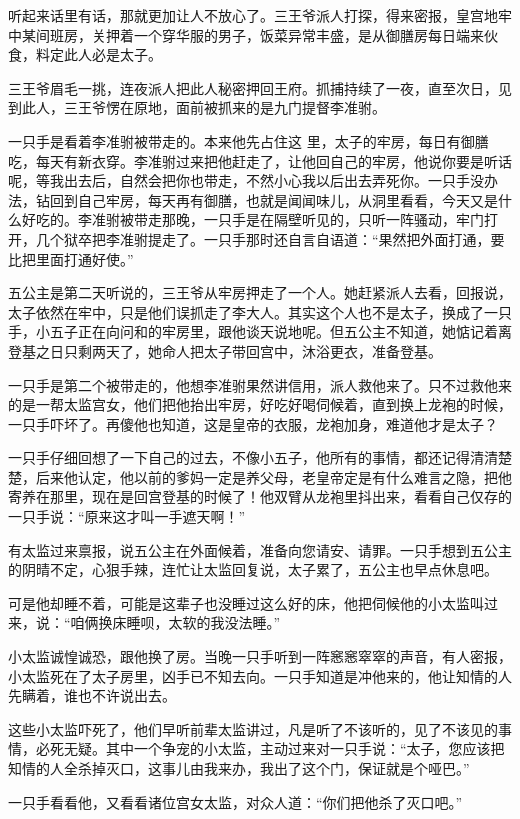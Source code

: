 听起来话里有话，那就更加让人不放心了。三王爷派人打探，得来密报，皇宫地牢中某间班房，关押着一个穿华服的男子，饭菜异常丰盛，是从御膳房每日端来伙食，料定此人必是太子。

三王爷眉毛一挑，连夜派人把此人秘密押回王府。抓捕持续了一夜，直至次日，见到此人，三王爷愣在原地，面前被抓来的是九门提督李准驸。

一只手是看着李准驸被带走的。本来他先占住这
里，太子的牢房，每日有御膳吃，每天有新衣穿。李准驸过来把他赶走了，让他回自己的牢房，他说你要是听话呢，等我出去后，自然会把你也带走，不然小心我以后出去弄死你。一只手没办法，钻回到自己牢房，每天再有御膳，也就是闻闻味儿，从洞里看看，今天又是什么好吃的。李准驸被带走那晚，一只手是在隔壁听见的，只听一阵骚动，牢门打开，几个狱卒把李准驸提走了。一只手那时还自言自语道：“果然把外面打通，要比把里面打通好使。”

五公主是第二天听说的，三王爷从牢房押走了一个人。她赶紧派人去看，回报说，太子依然在牢中，只是他们误抓走了李大人。其实这个人也不是太子，换成了一只手，小五子正在向问和的牢房里，跟他谈天说地呢。但五公主不知道，她惦记着离登基之日只剩两天了，她命人把太子带回宫中，沐浴更衣，准备登基。

一只手是第二个被带走的，他想李准驸果然讲信用，派人救他来了。只不过救他来的是一帮太监宫女，他们把他抬出牢房，好吃好喝伺候着，直到换上龙袍的时候，一只手吓坏了。再傻他也知道，这是皇帝的衣服，龙袍加身，难道他才是太子？

一只手仔细回想了一下自己的过去，不像小五子，他所有的事情，都还记得清清楚楚，后来他认定，他以前的爹妈一定是养父母，老皇帝定是有什么难言之隐，把他寄养在那里，现在是回宫登基的时候了！他双臂从龙袍里抖出来，看看自己仅存的一只手说：“原来这才叫一手遮天啊！”

有太监过来禀报，说五公主在外面候着，准备向您请安、请罪。一只手想到五公主的阴晴不定，心狠手辣，连忙让太监回复说，太子累了，五公主也早点休息吧。

可是他却睡不着，可能是这辈子也没睡过这么好的床，他把伺候他的小太监叫过来，说：“咱俩换床睡呗，太软的我没法睡。”

小太监诚惶诚恐，跟他换了房。当晚一只手听到一阵窸窸窣窣的声音，有人密报，小太监死在了太子房里，凶手已不知去向。一只手知道是冲他来的，他让知情的人先瞒着，谁也不许说出去。

这些小太监吓死了，他们早听前辈太监讲过，凡是听了不该听的，见了不该见的事情，必死无疑。其中一个争宠的小太监，主动过来对一只手说：“太子，您应该把知情的人全杀掉灭口，这事儿由我来办，我出了这个门，保证就是个哑巴。”

一只手看看他，又看看诸位宫女太监，对众人道：“你们把他杀了灭口吧。”

